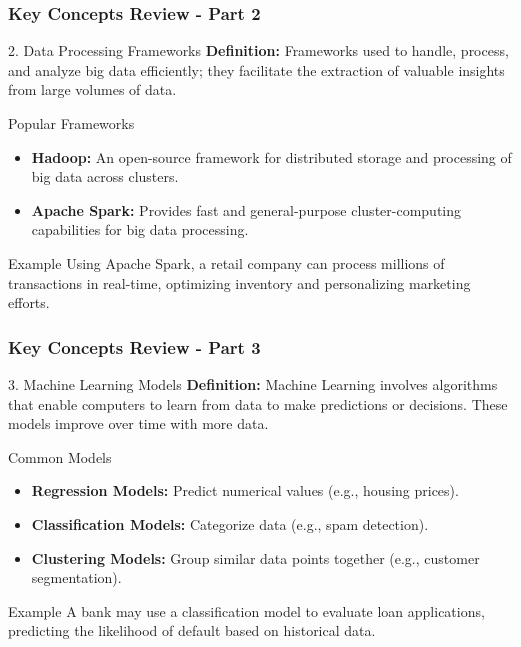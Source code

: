 \documentclass[aspectratio=169]{beamer}
\begin{document}
\begin{frame}[fragile]
    \frametitle{Key Concepts Review - Part 2}
    \begin{block}{2. Data Processing Frameworks}
        \textbf{Definition:} 
        Frameworks used to handle, process, and analyze big data efficiently; they facilitate the extraction of valuable insights from large volumes of data.
    \end{block}

    \begin{block}{Popular Frameworks}
        \begin{itemize}
            \item \textbf{Hadoop:} An open-source framework for distributed storage and processing of big data across clusters.
            \item \textbf{Apache Spark:} Provides fast and general-purpose cluster-computing capabilities for big data processing.
        \end{itemize}
    \end{block}

    \begin{block}{Example}
        Using Apache Spark, a retail company can process millions of transactions in real-time, optimizing inventory and personalizing marketing efforts.
    \end{block}
\end{frame}

\begin{frame}[fragile]
    \frametitle{Key Concepts Review - Part 3}
    \begin{block}{3. Machine Learning Models}
        \textbf{Definition:} 
        Machine Learning involves algorithms that enable computers to learn from data to make predictions or decisions. These models improve over time with more data.
    \end{block}

    \begin{block}{Common Models}
        \begin{itemize}
            \item \textbf{Regression Models:} Predict numerical values (e.g., housing prices). 
            \item \textbf{Classification Models:} Categorize data (e.g., spam detection).
            \item \textbf{Clustering Models:} Group similar data points together (e.g., customer segmentation).
        \end{itemize}
    \end{block}

    \begin{block}{Example}
        A bank may use a classification model to evaluate loan applications, predicting the likelihood of default based on historical data.
    \end{block}
\end{frame}
\end{document}
